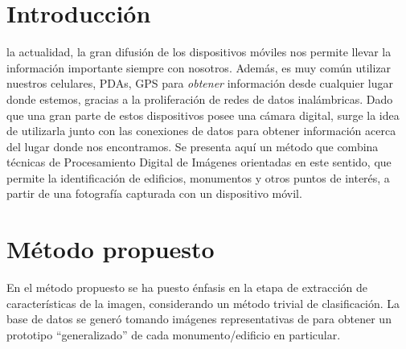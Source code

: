 \documentclass[conference,a4paper,10pt,oneside,final]{tfmpd}
\begin{document}
\section{Introducción}
%
%
%
 la actualidad, la gran difusión de los dispositivos móviles nos
permite llevar la información importante siempre con nosotros. Además, es muy 
común utilizar nuestros celulares, PDAs, GPS para \emph{obtener}
información desde cualquier lugar donde estemos, gracias a la proliferación de
redes de datos inalámbricas. Dado que una gran parte de estos dispositivos
posee una cámara
digital, surge la idea de utilizarla junto con las conexiones de datos para
obtener información acerca del lugar donde nos encontramos. Se presenta aquí
un método que combina técnicas de Procesamiento Digital de Imágenes orientadas
en este sentido, que permite la
identificación de edificios, monumentos y otros puntos de interés, a partir
de una fotografía capturada con un dispositivo móvil.
%
%
%
%
\section{Método propuesto}
En el método propuesto se ha puesto énfasis en la etapa de 
extracción de características de la imagen, considerando
un método trivial de clasificación.
La base de datos se generó tomando  imágenes representativas de
para obtener un prototipo ``generalizado'' de cada monumento/edificio 
en particular.
%
%
\end{document}
